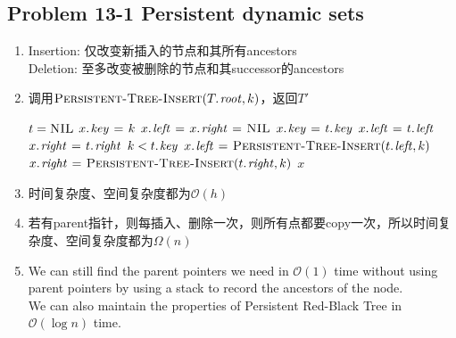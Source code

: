 \subsection*{Problem 13-1 Persistent dynamic sets}
\begin{enumerate}
	\item	Insertion: 仅改变新插入的节点和其所有ancestors \\
		Deletion: 至多改变被删除的节点和其successor的ancestors
	\item	调用$\proc{Persistent-Tree-Insert}(\attrib{T}{root}, k)$，返回$T'$
		\begin{codebox}
		\li	\If $t = \textnormal{\scshape NIL}$
		\li	\Then
				$\attrib{x}{key} \gets k$
		\li		$\attrib{x}{left} \gets \attrib{x}{right} \gets \const{NIL}$
		\li	\Else
				$\attrib{x}{key} \gets \attrib{t}{key}$
		\li		$\attrib{x}{left} \gets \attrib{t}{left}$
		\li		$\attrib{x}{right} \gets \attrib{t}{right}$
		\li		\If $k < \attrib{t}{key}$
		\li		\Then
					$\attrib{x}{left} \gets \proc{Persistent-Tree-Insert}(\attrib{t}{left}, k)$
		\li		\Else
					$\attrib{x}{right} \gets \proc{Persistent-Tree-Insert}(\attrib{t}{right}, k)$
				\End
			\End
		\li	\Return $x$
		\end{codebox}
	\item	时间复杂度、空间复杂度都为$\mathcal{O}(h)$
	\item	若有parent指针，则每插入、删除一次，则所有点都要copy一次，所以时间复杂度、空间复杂度都为$\Omega(n)$
	\item	We can still find the parent pointers we need in $\mathcal{O}(1)$ time without using parent pointers by using a stack to record the ancestors of the node. \\
		We can also maintain the properties of Persistent Red-Black Tree in $\mathcal{O}(\log{n})$ time.
\end{enumerate}

